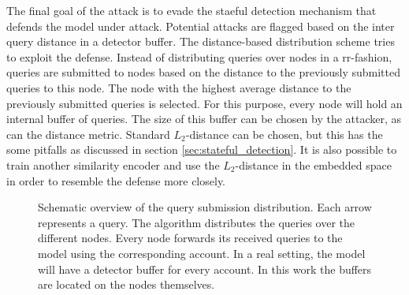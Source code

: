 The final goal of the attack is to evade the staeful detection mechanism that defends the model under attack. Potential attacks are flagged based on the inter query distance in a detector buffer. The distance-based distribution scheme tries to exploit the defense. Instead of distributing queries over nodes in a \gls{rr}-fashion, queries are submitted to nodes based on the distance to the previously submitted queries to this node. The node with the highest average distance to the previously submitted queries is selected. For this purpose, every node will hold an internal buffer of queries. The size of this buffer can be chosen by the attacker, as can the distance metric. Standard $L_2$-distance can be chosen, but this has the some pitfalls as discussed in section \ref{sec:stateful_detection}. It is also possible to train another similarity encoder and use the $L_2$-distance in the embedded space in order to resemble the defense more closely.\\

\begin{figure}
\centering
{}
\caption[Schematic overview of the query submission distribution]{Schematic overview of the query submission distribution. Each arrow represents a query. The algorithm distributes the queries over the different nodes. Every node forwards its received queries to the model using the corresponding account. In a real setting, the model will have a detector buffer for every account. In this work the buffers are located on the nodes themselves.}
\label{fig:distribution_overview}
\end{figure}

